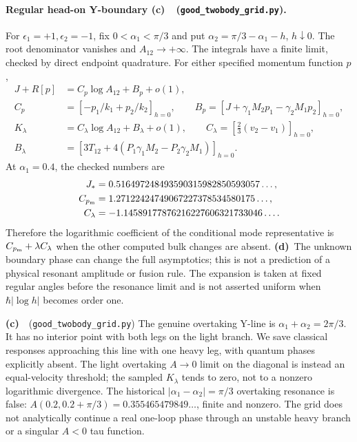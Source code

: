 \documentclass[11pt,a4paper]{article}
\newcommand{\Cc}{\textbf{(c)}\ }
\newcommand{\Cd}{\textbf{(d)}\ }
\newcommand{\file}[1]{\nolinkurl{#1}}
\newcommand{\grid}{\file{good_twobody_grid.py}}
\begin{document}
\paragraph{Regular head-on Y-boundary \Cc\ (\grid).}
For \(\epsilon_1=+1,\epsilon_2=-1\), fix
\(0<\alpha_1<\pi/3\) and put
\(\alpha_2=\pi/3-\alpha_1-h\), \(h\downarrow0\).
The root denominator vanishes and \(A_{12}\to+\infty\).
The integrals have a finite limit, checked by direct endpoint quadrature.
For either specified momentum function \(p\),
\begin{align}
 J+R[p]&=C_p\log A_{12}+B_p+o(1),\\
 C_p&=\left[-p_1/k_1+p_2/k_2\right]_{h=0},\qquad
 B_p=\left[J+\gamma_1M_2p_1-\gamma_2M_1p_2\right]_{h=0},\\
 K_\lambda&=C_\lambda\log A_{12}+B_\lambda+o(1),\qquad
 C_\lambda=\left[\tfrac23(v_2-v_1)\right]_{h=0},\\
 B_\lambda&=\left[3T_{12}
       +4(P_1\gamma_1M_2-P_2\gamma_2M_1)\right]_{h=0}.
 \label{eq:resonance}
\end{align}
At \(\alpha_1=0.4\), the checked numbers are
\begin{align*}
 J_*&=0.516497248493590315982850593057\ldots,\\
 C_{p_{\rm m}}&=1.27122424749067227378534580175\ldots,\\
 C_\lambda&=-1.14589177876216227606321733046\ldots.
\end{align*}
Therefore the logarithmic coefficient of the conditional mode
representative is \(C_{p_{\rm m}}+\lambda C_\lambda\) when the
other computed bulk changes are absent. \Cd The unknown boundary
phase can change the full asymptotics; this is not a prediction of a
physical resonant amplitude or fusion rule. The expansion is taken at
fixed regular angles before the resonance limit and is not asserted
uniform when \(\hbar|\log h|\) becomes order one.

\Cc\ (\grid) The genuine overtaking Y-line is
\(\alpha_1+\alpha_2=2\pi/3\). It has no interior point with both
legs on the light branch. We save classical responses approaching this
line with one heavy leg, with quantum phases explicitly absent.
The light overtaking \(A\to0\) limit on the diagonal is instead an
equal-velocity threshold; the sampled \(K_\lambda\) tends to zero,
not to a nonzero logarithmic divergence. The historical
\(|\alpha_1-\alpha_2|=\pi/3\) overtaking resonance is false:
\(A(0.2,0.2+\pi/3)=0.355465479849\ldots\), finite and nonzero.
The grid does not analytically continue a real one-loop phase through
an unstable heavy branch or a singular \(A<0\) tau function.
\end{document}
